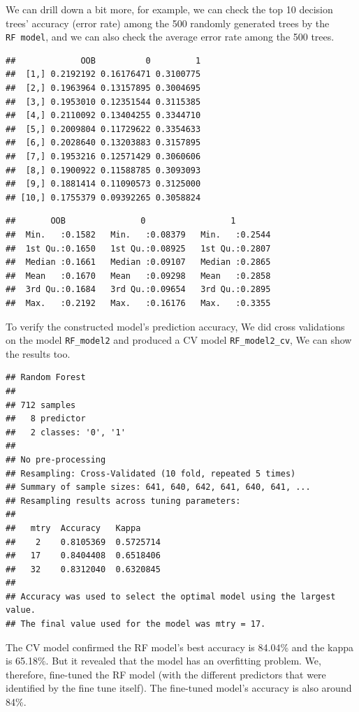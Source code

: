 \documentclass[
]{book}
\begin{document}
We can drill down a bit more, for example, we can check the top 10 decision trees' accuracy (error rate) among the 500 randomly generated trees by the \texttt{RF\ model}, and we can also check the average error rate among the 500 trees.

\begin{verbatim}
##             OOB          0         1
##  [1,] 0.2192192 0.16176471 0.3100775
##  [2,] 0.1963964 0.13157895 0.3004695
##  [3,] 0.1953010 0.12351544 0.3115385
##  [4,] 0.2110092 0.13404255 0.3344710
##  [5,] 0.2009804 0.11729622 0.3354633
##  [6,] 0.2028640 0.13203883 0.3157895
##  [7,] 0.1953216 0.12571429 0.3060606
##  [8,] 0.1900922 0.11588785 0.3093093
##  [9,] 0.1881414 0.11090573 0.3125000
## [10,] 0.1755379 0.09392265 0.3058824
\end{verbatim}

\begin{verbatim}
##       OOB               0                 1         
##  Min.   :0.1582   Min.   :0.08379   Min.   :0.2544  
##  1st Qu.:0.1650   1st Qu.:0.08925   1st Qu.:0.2807  
##  Median :0.1661   Median :0.09107   Median :0.2865  
##  Mean   :0.1670   Mean   :0.09298   Mean   :0.2858  
##  3rd Qu.:0.1684   3rd Qu.:0.09654   3rd Qu.:0.2895  
##  Max.   :0.2192   Max.   :0.16176   Max.   :0.3355
\end{verbatim}

To verify the constructed model's prediction accuracy, We did cross validations on the model \texttt{RF\_model2} and produced a CV model \texttt{RF\_model2\_cv}, We can show the results too.

\begin{verbatim}
## Random Forest 
## 
## 712 samples
##   8 predictor
##   2 classes: '0', '1' 
## 
## No pre-processing
## Resampling: Cross-Validated (10 fold, repeated 5 times) 
## Summary of sample sizes: 641, 640, 642, 641, 640, 641, ... 
## Resampling results across tuning parameters:
## 
##   mtry  Accuracy   Kappa    
##    2    0.8105369  0.5725714
##   17    0.8404408  0.6518406
##   32    0.8312040  0.6320845
## 
## Accuracy was used to select the optimal model using the largest value.
## The final value used for the model was mtry = 17.
\end{verbatim}

The CV model confirmed the RF model's best accuracy is 84.04\% and the kappa is 65.18\%. But it revealed that the model has an overfitting problem. We, therefore, fine-tuned the RF model (with the different predictors that were identified by the fine tune itself). The fine-tuned model's accuracy is also around 84\%.
\end{document}
